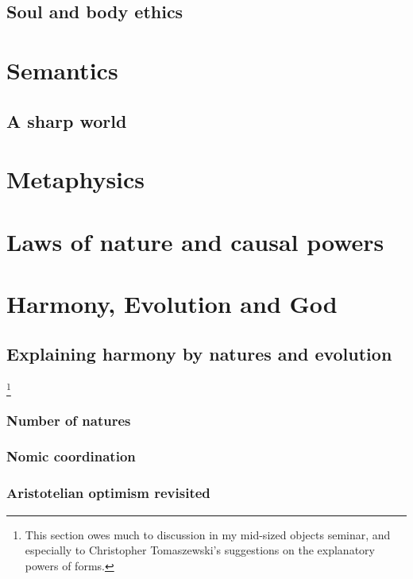 \section{Soul and body ethics}
\chaptertail 

\def\mychapter{VII}

\chapter{Semantics}\label{ch:semantics}
\section{A sharp world}
\chaptertail

\def\mychapter{VIII}

\chapter{Metaphysics}\label{ch:metaphysics}
\chaptertail 

\def\mychapter{IX}

\chapter{Laws of nature and causal powers}\label{ch:laws}
\chaptertail

\def\mychapter{X}

\chapter{Harmony, Evolution and God}\label{ch:God}
\section{Explaining harmony by natures and evolution}
\footnote{This section owes much to discussion in my mid-sized objects seminar, and especially to Christopher Tomaszewski's suggestions on the explanatory powers of forms.}
\subsection{Number of natures}
\subsection{Nomic coordination}
\subsection{Aristotelian optimism revisited}
